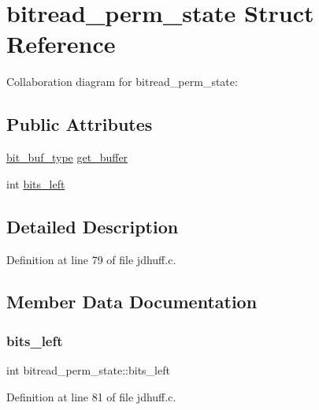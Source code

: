 \hypertarget{structbitread__perm__state}{}\section{bitread\+\_\+perm\+\_\+state Struct Reference}
\label{structbitread__perm__state}


Collaboration diagram for bitread\+\_\+perm\+\_\+state\+:
\subsection*{Public Attributes}
\begin{DoxyCompactItemize}
\item 
\mbox{\hyperlink{jdhuff_8c_ab2d47e546a8ed21c68e22f54535574a8}{bit\+\_\+buf\+\_\+type}} \mbox{\hyperlink{structbitread__perm__state_a39dce6ef08822b3ae5c8ba2329d079bd}{get\+\_\+buffer}}
\item 
int \mbox{\hyperlink{structbitread__perm__state_ac138b781f4681902dec2e44007f672c4}{bits\+\_\+left}}
\end{DoxyCompactItemize}


\subsection{Detailed Description}


Definition at line 79 of file jdhuff.\+c.



\subsection{Member Data Documentation}
\mbox{\label{structbitread__perm__state_ac138b781f4681902dec2e44007f672c4}} 
\subsubsection{\texorpdfstring{bits\_left}{bits\_left}}
{\footnotesize\ttfamily int bitread\+\_\+perm\+\_\+state\+::bits\+\_\+left}



Definition at line 81 of file jdhuff.\+c.

\mbox{\label{structbitread__perm__state_a39dce6ef08822b3ae5c8ba2329d079bd}} 
